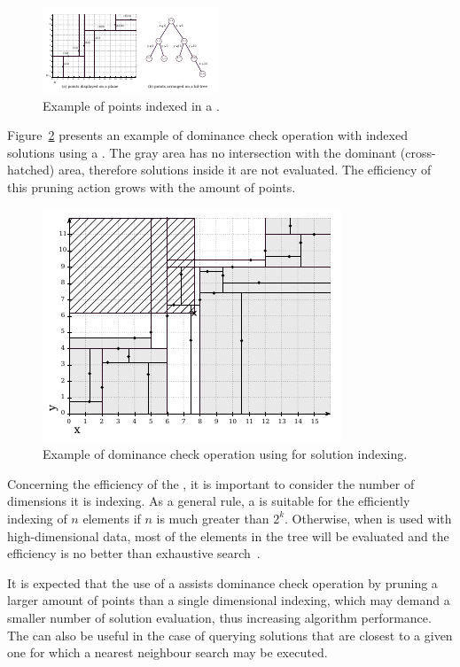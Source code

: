 \begin{figure}[H]
  \centering
  \includegraphics[scale=3.8]{img/kdt/dom-kd}
  \caption{Example of points indexed in a \kdtree{}.}
  \label{fig:kdom-kd}
\end{figure}

Figure~\ref{fig:query} presents an example of dominance check operation with indexed
solutions using a .
The gray area has no intersection with the dominant (cross-hatched) area, therefore
solutions inside it are not evaluated.
The efficiency of this pruning action grows
with the amount of points.

\begin{figure}[H]
  \centering
  \includegraphics[scale=1.7]{img/kdt/query}
  \caption{Example of dominance check operation using \kdtree{} for solution indexing.}
  \label{fig:query}
\end{figure}

Concerning the efficiency of the \kdtree{}, it is important to
consider the number of dimensions it is indexing.
As a general rule, a \kdtree{} is suitable for the efficiently indexing of $n$ elements
if $n$ is much greater than $2^k$.
Otherwise, when \kdtree{} is used with high-dimensional data, most of the elements
in the tree will be evaluated and the efficiency is no better than exhaustive search~\cite{toth2004handbook}.

It is expected that the use of a \kdtree{}
assists dominance check operation by
pruning a larger amount of points than a single dimensional indexing,
which may demand a smaller number of solution evaluation,
thus increasing algorithm performance.
The \kdtree{} can also be useful in the case of querying
solutions that are closest to a given one for which
a nearest neighbour search may be executed.
